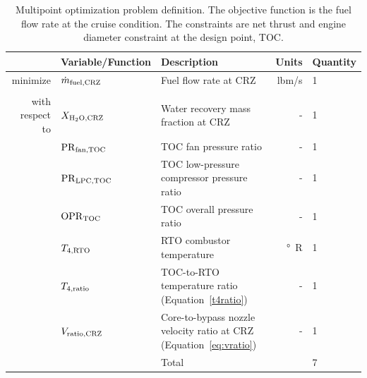 \documentclass[conf]{new-aiaa}
\begin{document}
\begin{table}[hbt!]
    \centering
    \caption{
        Multipoint optimization problem definition.
        The objective function is the fuel flow rate at the cruise condition.
        The constraints are net thrust and engine diameter constraint at the design point, TOC.
    }
    \small
    \renewcommand{\arraystretch}{1.2}
    \begin{tabular}{r l l r l}
        \toprule
                        & Variable/Function              & Description                                                              & Units            & Quantity \\
        \hline
        minimize        & $\dot{m}_{\rm{fuel,CRZ}} $     & Fuel flow rate at CRZ                                                    & \unit{lbm/s}     & 1        \\
                        &                                &                                                                          &                  &          \\
        with respect to & $X_{\rm{H_2O,CRZ}}$            & Water recovery mass fraction at CRZ                                      & -                & 1        \\
                        & $\rm{PR}_{\rm{fan,TOC}}$       & TOC fan pressure ratio                                                   & -                & 1        \\
                        & $\rm{PR}_{\rm{LPC,TOC}}$       & TOC low-pressure compressor pressure ratio                               & -                & 1        \\
                        & $\rm{OPR}_{\rm{TOC}}$          & TOC overall pressure ratio                                               & -                & 1        \\
                        & $T_{4,\rm{RTO}}$               & RTO combustor temperature                                                & \unit{\degree R} & 1        \\
                        & $T_{4,\rm{ratio}}$             & TOC-to-RTO temperature ratio (Equation~\eqref{t4ratio})                  & -                & 1        \\
                        & $V_{\rm{ratio,CRZ}}$           & Core-to-bypass nozzle velocity ratio at CRZ (Equation~\eqref{eq:vratio}) & -                & 1        \\
        \cline{3-5}
                        &                                & Total                                                                    &                  & 7        \\

\end{tabular}
\end{table}
\end{document}
